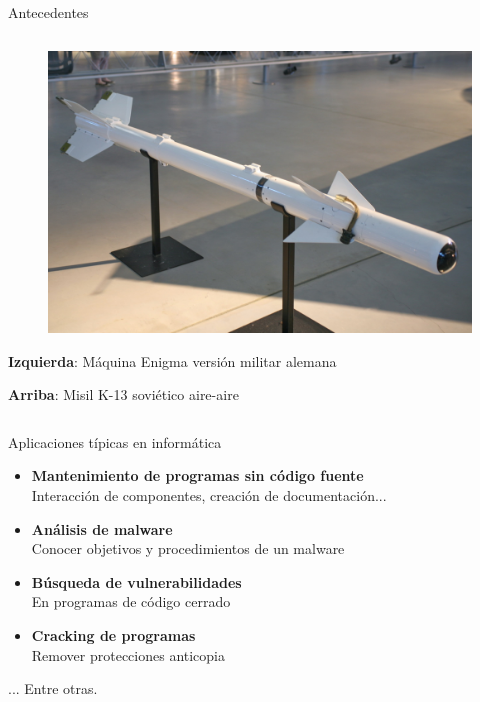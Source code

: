 \documentclass{beamer}
\begin{document}
\begin{frame}{Antecedentes}
\begin{columns}
\begin{column}{.50\textwidth}
\begin{figure}
\vspace{-1ex}\hspace{-2.5ex}\includegraphics[scale=0.11]{K-13.jpg}
\end{figure}

\vspace{2ex}
\textbf{Izquierda}: Máquina Enigma versión militar alemana

\vspace{1ex}

\textbf{Arriba}: Misil K-13 soviético aire-aire 

\end{column}

\end{columns}

\end{frame}

\begin{frame}{Aplicaciones típicas en informática}
\begin{itemize}
	\item \textbf{Mantenimiento de programas sin código fuente}\\ \hspace{4ex}Interacción de componentes, creación de documentación...
	\item \textbf{Análisis de malware}\\ \hspace{4ex}Conocer objetivos y procedimientos de un malware
	\item \textbf{Búsqueda de vulnerabilidades}\\ \hspace{4ex}En programas de código cerrado
	\item \textbf{Cracking de programas}\\ \hspace{4ex}Remover protecciones anticopia
\end{itemize}
\begin{center}... Entre otras.\end{center}
\end{frame}
\end{document}
